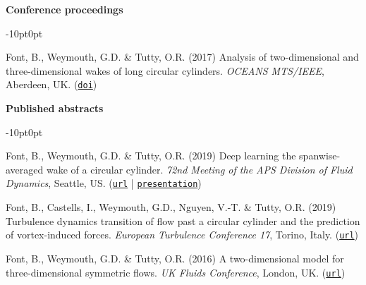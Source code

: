 \documentclass[line]{res}
\newenvironment{p}
  {\begin{adjustwidth}{-10pt}{0pt}}
  {\end{adjustwidth}}
\begin{document}
\begin{resume}
\hspace{-1cm}\textbf{Conference proceedings}\vspace{0.25cm}
\begin{p}
\begin{etaremune}[leftmargin=-2pt,parsep=5pt]
\item Font, B., Weymouth, G.D.  \&  Tutty, O.R. (2017) Analysis of two-dimensional and three-dimensional wakes of long circular cylinders. {\em OCEANS MTS/IEEE}, Aberdeen, UK. (\href{https://doi.org/10.1109/OCEANSE.2017.8084904}{\texttt{doi}})
\end{etaremune}
\end{p}

\hspace{-1cm}\textbf{Published abstracts}\vspace{0.25cm}
\begin{p}
\begin{etaremune}[leftmargin=0pt,parsep=5pt]
\item Font, B., Weymouth, G.D.  \&  Tutty, O.R. (2019)  Deep learning the spanwise-averaged wake of a circular cylinder. \textit{72nd Meeting of the APS Division of Fluid Dynamics}, Seattle, US. (\href{https://meetings.aps.org/Meeting/DFD19/Session/L17.5}{\texttt{url}} | \href{https://github.com/b-fg/APS2019}{\texttt{presentation}})
\item Font, B., Castells, I., Weymouth, G.D., Nguyen, V.-T.  \&  Tutty, O.R. (2019)  Turbulence dynamics transition of flow past a circular cylinder and the prediction of vortex-induced forces. \textit{European Turbulence Conference 17}, Torino, Italy. (\href{https://etc17.fyper.com/program/show_slot/41}{\texttt{url}})
\item Font, B., Weymouth, G.D.  \&  Tutty, O.R. (2016)  A two-dimensional model for three-dimensional symmetric flows. \textit{UK Fluids Conference}, London, UK. (\href{https://www.imperial.ac.uk/media/imperial-college/faculty-of-engineering/aeronautics/UK-Fluids-Conference-2016-booklet.pdf}{\texttt{url}})
\end{etaremune}
\end{p}


\end{resume}
\end{document}
